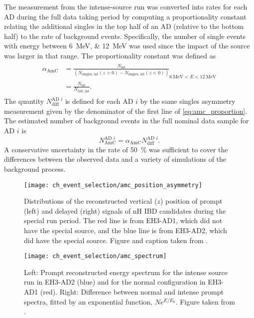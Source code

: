 The measurement from the intense-source run was converted
into rates for each AD during the full data taking period
by computing a proportionality constant
relating the additional singles in the top half of an AD
(relative to the bottom half)
to the rate of \amc{} background events.
Specifically, the number of single events
with energy between \SIlist{6;12}{\MeV} was used
since the impact of the \amc{} source was larger in that range.
The proportionality constant was defined as
\begin{align}\label{eq:amc_proportion}
    \begin{split}
        \alpha_\text{AmC} &= \frac{N_\text{int}}{
            (N_\text{singles, int}(z>0) - N_\text{singles, int}(z < 0))
        }_
        {
            \SI{6}{\MeV} < E < \SI{12}{\MeV}
        } \\
        &= \frac{N_\text{int}}{N_\text{diff, int}}.
    \end{split}
\end{align}
The quantity $N_\text{diff}^{\text{AD }i}$ is defined for each AD $i$
by the same singles asymmetry measurement
given by the denominator of the first line of \cref{eq:amc_proportion}.
The estimated number of \amc{} background events
in the full nominal data sample for AD $i$ is
\begin{equation}\label{eq:amc_count}
    N_\text{AmC}^{\text{AD }i} = \alpha_\text{AmC} N_\text{diff}^{\text{AD }i}.
\end{equation}
A conservative uncertainty in the rate of \SI{50}{\percent}
was sufficient to cover the differences between the observed data
and a variety of simulations of the \amc{} background process.

\begin{figure}
    \centering
    \texttt{[image: ch\_event\_selection/amc\_position\_asymmetry]}
    \caption[Intense \amc{} run vertical positions]{
        Distributions of the reconstructed vertical ($z$) position
        of prompt (left) and delayed (right) signals of nH IBD candidates
        during the special \amc{} run period.
        The red line is from EH3-AD1, which did not have the special \amc{} source,
        and the blue line is from EH3-AD2, which did have the special \amc{} source.
        Figure and caption taken from \cite{nh2016technote}.
    }
    \label{fig:amc_position}
\end{figure}

\begin{figure}
    \centering
    \texttt{[image: ch\_event\_selection/amc\_spectrum]}
    \caption[\amc{} prompt spectrum]{
        Left: Prompt reconstructed energy spectrum
        for the intense \amc{} source run in EH3-AD2 (blue)
        and for the normal configuration in EH3-AD1 (red).
        Right: Difference between normal and intense prompt spectra,
        fitted by an exponential function, $Ne^{E/E_0}$.
        Figure taken from \cite{nh2016technote}.
    }
    \label{fig:amc_spectrum}
\end{figure}

